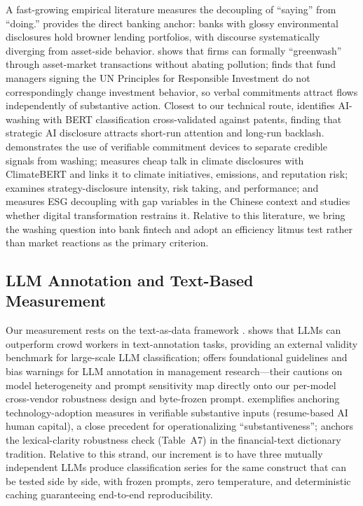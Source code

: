 A fast-growing empirical literature measures the decoupling of ``saying'' from
``doing.'' \textcite{giannetti2026glossy} provides the direct banking anchor:
banks with glossy environmental disclosures hold browner lending portfolios,
with discourse systematically diverging from asset-side behavior.
\textcite{duchin2025greenwash} shows that firms can formally ``greenwash''
through asset-market transactions without abating pollution;
\textcite{kimyoon2023pri} finds that fund managers signing the UN Principles
for Responsible Investment do not correspondingly change investment behavior,
so verbal commitments attract flows independently of substantive action.
Closest to our technical route, \textcite{song2026aiwashing} identifies
AI-washing with BERT classification cross-validated against patents, finding
that strategic AI disclosure attracts short-run attention and long-run
backlash. \textcite{flammer2021greenbonds} demonstrates the use of verifiable
commitment devices to separate credible signals from washing;
\textcite{bingler2024cheaptalk} measures cheap talk in climate disclosures
with ClimateBERT and links it to climate initiatives, emissions, and
reputation risk; \textcite{cai2025cheaptalk} examines strategy-disclosure
intensity, risk taking, and performance; and \textcite{chen2024esgdecoupling}
measures ESG decoupling with gap variables in the Chinese context and studies
whether digital transformation restrains it. Relative to this literature, we
bring the washing question into bank fintech and adopt an efficiency litmus
test rather than market reactions as the primary criterion.

\subsection{LLM Annotation and Text-Based Measurement}

Our measurement rests on the text-as-data framework
\parencite{gentzkow2019text}. \textcite{gilardi2023chatgpt} shows that LLMs
can outperform crowd workers in text-annotation tasks, providing an external
validity benchmark for large-scale LLM classification;
\textcite{carlsonburbano2026llm} offers foundational guidelines and bias
warnings for LLM annotation in management research---their cautions on model
heterogeneity and prompt sensitivity map directly onto our per-model
cross-vendor robustness design and byte-frozen prompt.
\textcite{babina2024ai} exemplifies anchoring technology-adoption measures in
verifiable substantive inputs (resume-based AI human capital), a close
precedent for operationalizing ``substantiveness'';
\textcite{loughranmcdonald2011liability} anchors the lexical-clarity
robustness check (Table~A7) in the financial-text dictionary tradition.
Relative to this strand, our increment is to have three mutually independent
LLMs produce classification series for the same construct that can be tested
side by side, with frozen prompts, zero temperature, and deterministic caching
guaranteeing end-to-end reproducibility.

